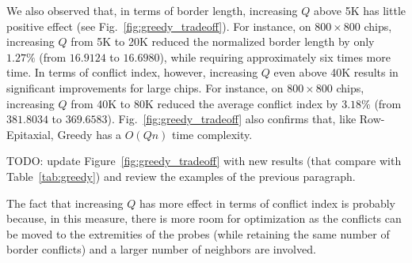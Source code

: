 We also observed that, in terms of border length, increasing $Q$ above 5K has
little positive effect (see Fig.~\ref{fig:greedy_tradeoff}). For instance, on
$800\times 800$ chips, increasing $Q$ from 5K to 20K reduced the normalized
border length by only $1.27\%$ (from $16.9124$ to $16.6980$), while requiring
approximately six times more time. In terms of conflict index, however,
increasing $Q$ even above 40K results in significant improvements for large
chips. For instance, on $800\times 800$ chips, increasing $Q$ from 40K to 80K
reduced the average conflict index by $3.18\%$ (from $381.8034$ to $369.6583$).
Fig.~\ref{fig:greedy_tradeoff} also confirms that, like Row-Epitaxial, Greedy
has a $O(Qn)$ time complexity.

TODO: update Figure~\ref{fig:greedy_tradeoff} with new results (that compare
with Table~\ref{tab:greedy}) and review the examples of the previous paragraph.

The fact that increasing $Q$ has more effect in terms of conflict index is
probably because, in this measure, there is more room for optimization as the
conflicts can be moved to the extremities of the probes (while retaining the
same number of border conflicts) and a larger number of neighbors are involved.
